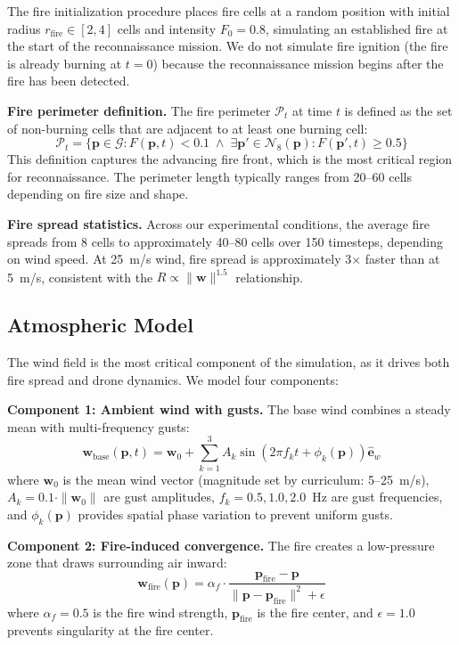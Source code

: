 \documentclass[12pt,a4paper]{article}
\DeclareRobustCommand{\cG}{\mathcal{G}}
\DeclareRobustCommand{\cN}{\mathcal{N}}
\DeclareRobustCommand{\cP}{\mathcal{P}}
\DeclareRobustCommand{\vect}[1]{\bm{#1}}
\begin{document}
The fire initialization procedure places fire cells at a random position with initial radius $r_{\text{fire}} \in [2, 4]$ cells and intensity $F_0 = 0.8$, simulating an established fire at the start of the reconnaissance mission. We do not simulate fire ignition (the fire is already burning at $t = 0$) because the reconnaissance mission begins after the fire has been detected.

\textbf{Fire perimeter definition.} The fire perimeter $\cP_t$ at time $t$ is defined as the set of non-burning cells that are adjacent to at least one burning cell:
\begin{equation}
    \cP_t = \{\vect{p} \in \cG : F(\vect{p}, t) < 0.1 \;\land\; \exists \vect{p}' \in \cN_8(\vect{p}) : F(\vect{p}', t) \geq 0.5\}
\end{equation}
This definition captures the advancing fire front, which is the most critical region for reconnaissance. The perimeter length typically ranges from 20--60 cells depending on fire size and shape.

\textbf{Fire spread statistics.} Across our experimental conditions, the average fire spreads from 8 cells to approximately 40--80 cells over 150 timesteps, depending on wind speed. At 25~m/s wind, fire spread is approximately 3$\times$ faster than at 5~m/s, consistent with the $R \propto \|\vect{w}\|^{1.5}$ relationship.

\subsection{Atmospheric Model}

The wind field is the most critical component of the simulation, as it drives both fire spread and drone dynamics. We model four components:

\textbf{Component 1: Ambient wind with gusts.}
The base wind combines a steady mean with multi-frequency gusts:
\begin{equation}
    \vect{w}_{\text{base}}(\vect{p}, t) = \vect{w}_0 + \sum_{k=1}^{3} A_k \sin(2\pi f_k t + \phi_k(\vect{p})) \hat{\vect{e}}_w
\end{equation}
where $\vect{w}_0$ is the mean wind vector (magnitude set by curriculum: 5--25~m/s), $A_k = 0.1 \cdot \|\vect{w}_0\|$ are gust amplitudes, $f_k = 0.5, 1.0, 2.0$~Hz are gust frequencies, and $\phi_k(\vect{p})$ provides spatial phase variation to prevent uniform gusts.

\textbf{Component 2: Fire-induced convergence.}
The fire creates a low-pressure zone that draws surrounding air inward:
\begin{equation}
    \vect{w}_{\text{fire}}(\vect{p}) = \alpha_f \cdot \frac{\vect{p}_{\text{fire}} - \vect{p}}{\|\vect{p} - \vect{p}_{\text{fire}}\|^2 + \epsilon}
\end{equation}
where $\alpha_f = 0.5$ is the fire wind strength, $\vect{p}_{\text{fire}}$ is the fire center, and $\epsilon = 1.0$ prevents singularity at the fire center.
\end{document}

